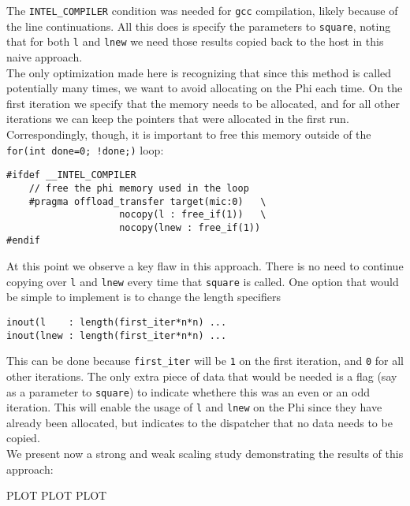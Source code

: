 \documentclass[11pt]{article}
\begin{document}
\noindent The \texttt{INTEL\_COMPILER} condition was needed for \texttt{gcc} compilation, likely because of the line continuations.  All this does is specify the parameters to \texttt{square}, noting that for both \texttt{l} and \texttt{lnew} we need those results copied back to the host in this naive approach.\\

\noindent The only optimization made here is recognizing that since this method is called potentially many times, we want to avoid allocating on the Phi each time.  On the first iteration we specify that the memory needs to be allocated, and for all other iterations we can keep the pointers that were allocated in the first run.  Correspondingly, though, it is important to free this memory outside of the \texttt{for(int done=0; !done;)} loop:

\begin{lstlisting}
#ifdef __INTEL_COMPILER
    // free the phi memory used in the loop
    #pragma offload_transfer target(mic:0)   \
                    nocopy(l : free_if(1))   \
                    nocopy(lnew : free_if(1))
#endif
\end{lstlisting}

\noindent At this point we observe a key flaw in this approach.  There is no need to continue copying over \texttt{l} and \texttt{lnew} every time that \texttt{square} is called.  One option that would be simple to implement is to change the length specifiers

\begin{lstlisting}
inout(l    : length(first_iter*n*n) ...
inout(lnew : length(first_iter*n*n) ...
\end{lstlisting}

\noindent This can be done because \texttt{first\_iter} will be \texttt{1} on the first iteration, and \texttt{0} for all other iterations.  The only extra piece of data that would be needed is a flag (say as a parameter to \texttt{square}) to indicate whethere this was an even or an odd iteration.  This will enable the usage of \texttt{l} and \texttt{lnew} on the Phi since they have already been allocated, but indicates to the dispatcher that no data needs to be copied.\\

\noindent We present now a strong and weak scaling study demonstrating the results of this approach:

\begin{center}
	{\Huge PLOT PLOT PLOT}
\end{center}
\end{document}
